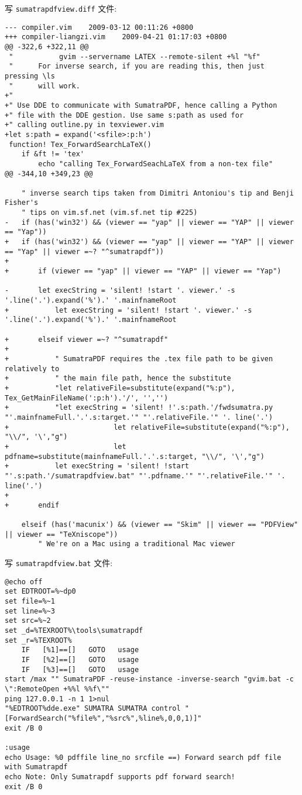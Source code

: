\documentclass{article}
\begin{document}
写 \verb|sumatrapdfview.diff| 文件:
{\tiny
\begin{verbatim}
--- compiler.vim	2009-03-12 00:11:26 +0800
+++ compiler-liangzi.vim	2009-04-21 01:17:03 +0800
@@ -322,6 +322,11 @@
 "           gvim --servername LATEX --remote-silent +%l "%f"
 "      For inverse search, if you are reading this, then just pressing \ls
 "      will work.
+"
+" Use DDE to communicate with SumatraPDF, hence calling a Python
+" file with the DDE gestion. Use same s:path as used for
+" calling outline.py in texviewer.vim
+let s:path = expand('<sfile>:p:h')
 function! Tex_ForwardSearchLaTeX()
 	if &ft != 'tex'
 		echo "calling Tex_ForwardSeachLaTeX from a non-tex file"
@@ -344,10 +349,23 @@
 	
 	" inverse search tips taken from Dimitri Antoniou's tip and Benji Fisher's
 	" tips on vim.sf.net (vim.sf.net tip #225)
-	if (has('win32') && (viewer == "yap" || viewer == "YAP" || viewer == "Yap"))
+	if (has('win32') && (viewer == "yap" || viewer == "YAP" || viewer == "Yap" || viewer =~? "^sumatrapdf"))
+
+		if (viewer == "yap" || viewer == "YAP" || viewer == "Yap")
 
-		let execString = 'silent! !start '. viewer.' -s '.line('.').expand('%').' '.mainfnameRoot
+			let execString = 'silent! !start '. viewer.' -s '.line('.').expand('%').' '.mainfnameRoot
 
+		elseif viewer =~? "^sumatrapdf"
+			
+			" SumatraPDF requires the .tex file path to be given relatively to
+			" the main file path, hence the substitute
+			"let relativeFile=substitute(expand("%:p"), Tex_GetMainFileName(':p:h').'/', '','')
+			"let execString = 'silent! !'.s:path.'/fwdsumatra.py "'.mainfnameFull.'.'.s:target.'" "'.relativeFile.'" '. line('.')
+                         let relativeFile=substitute(expand("%:p"), "\\/", '\',"g")
+                         let pdfname=substitute(mainfnameFull.'.'.s:target, "\\/", '\',"g")
+			let execString = 'silent! !start "'.s:path.'/sumatrapdfview.bat" "'.pdfname.'" "'.relativeFile.'" '. line('.')
+
+		endif
 
 	elseif (has('macunix') && (viewer == "Skim" || viewer == "PDFView" || viewer == "TeXniscope"))
 		" We're on a Mac using a traditional Mac viewer

\end{verbatim}
}
写 \verb|sumatrapdfview.bat| 文件:
{\tiny
\begin{verbatim}
@echo off
set EDTROOT=%~dp0
set file=%~1
set line=%~3
set src=%~2
set _d=%TEXROOT%\tools\sumatrapdf
set _r=%TEXROOT%
	IF   [%1]==[]   GOTO   usage
	IF   [%2]==[]   GOTO   usage
	IF   [%3]==[]   GOTO   usage
start /max "" SumatraPDF -reuse-instance -inverse-search "gvim.bat -c \":RemoteOpen +%%l %%f\""
ping 127.0.0.1 -n 1 1>nul
"%EDTROOT%dde.exe" SUMATRA SUMATRA control "[ForwardSearch("%file%","%src%",%line%,0,0,1)]"
exit /B 0

:usage
echo Usage: %0 pdffile line_no srcfile ==) Forward search pdf file with Sumatrapdf
echo Note: Only Sumatrapdf supports pdf forward search!
exit /B 0
\end{verbatim}
}
\end{document}
